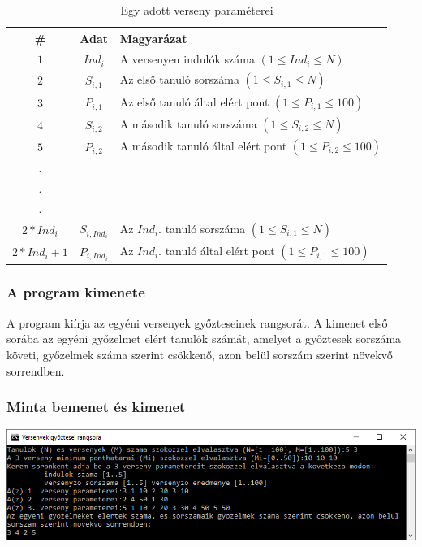 \documentclass[a4paper]{article}
\begin{document}
        \begin{table}[H]
          \centering
          \caption*{Egy adott verseny paraméterei}
          \begin{tabular}{ccl}
            \toprule
            \# & Adat & Magyarázat \\
            \midrule
            $1$ & $Ind_i$ & A versenyen indulók száma $(1 \leqslant Ind_i \leqslant N)$ \\
            $2$ & $S_{i,1}$ & Az első tanuló sorszáma $(1 \leqslant S_{i,1} \leqslant N)$ \\
            $3$ & $P_{i,1}$ & Az első tanuló által elért pont $(1 \leqslant P_{i,1} \leqslant 100)$ \\
            $4$ & $S_{i,2}$ & A második tanuló sorszáma $(1 \leqslant S_{i,2} \leqslant N)$ \\
            $5$ & $P_{i,2}$ & A második tanuló által elért pont $(1 \leqslant P_{i,2} \leqslant 100)$ \\
            . \\
            . \\
            . \\
            $2*Ind_i$ & $S_{i,Ind_i}$ & Az $Ind_i$. tanuló sorszáma $(1 \leqslant S_{i,1} \leqslant N)$ \\
            $2*Ind_i+1$ & $P_{i,Ind_i}$ & Az $Ind_i$. tanuló által elért pont $(1 \leqslant P_{i,1} \leqslant 100)$ \\
            \bottomrule
          \end{tabular}
        \end{table}
      \subsubsection{A program kimenete}
        A program kiírja az egyéni versenyek győzteseinek rangsorát.
        A kimenet első sorába az egyéni győzelmet elért tanulók számát,
        amelyet a győztesek sorszáma követi, győzelmek száma szerint csökkenő,
        azon belül sorszám szerint növekvő sorrendben.
      \subsubsection{Minta bemenet és kimenet}
        \includegraphics[width=\textwidth]{felhJo.PNG}
\end{document}
